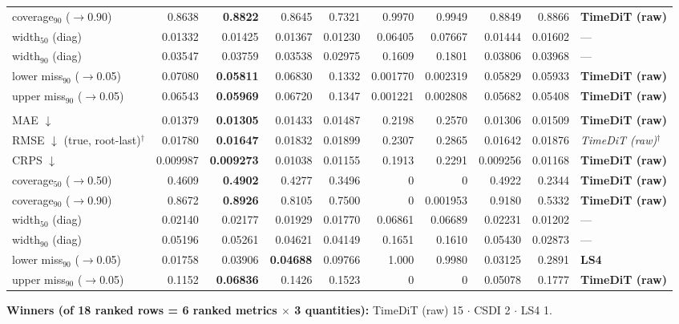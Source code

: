 \documentclass[11pt,a4paper]{article}
\begin{document}
\begin{landscape}
\begin{center}
\begin{tabular}{lrrrrrrrrl}
coverage$_{90}$ ($\to$0.90) & 0.8638 & \textbf{0.8822} & 0.8645 & 0.7321 & 0.9970 & 0.9949 & 0.8849 & 0.8866 & \textbf{TimeDiT (raw)} \\
width$_{50}$ (diag) & 0.01332 & 0.01425 & 0.01367 & 0.01230 & 0.06405 & 0.07667 & 0.01444 & 0.01602 & --- \\
width$_{90}$ (diag) & 0.03547 & 0.03759 & 0.03538 & 0.02975 & 0.1609 & 0.1801 & 0.03806 & 0.03968 & --- \\
lower miss$_{90}$ ($\to$0.05) & 0.07080 & \textbf{0.05811} & 0.06830 & 0.1332 & 0.001770 & 0.002319 & 0.05829 & 0.05933 & \textbf{TimeDiT (raw)} \\
upper miss$_{90}$ ($\to$0.05) & 0.06543 & \textbf{0.05969} & 0.06720 & 0.1347 & 0.001221 & 0.002808 & 0.05682 & 0.05408 & \textbf{TimeDiT (raw)} \\
\addlinespace
\multicolumn{10}{l}{\textbf{rv ($M$ scalar)}} \\
MAE $\downarrow$ & 0.01379 & \textbf{0.01305} & 0.01433 & 0.01487 & 0.2198 & 0.2570 & 0.01306 & 0.01509 & \textbf{TimeDiT (raw)} \\
RMSE $\downarrow$ (true, root-last)$^{\dagger}$ & 0.01780 & \textbf{0.01647} & 0.01832 & 0.01899 & 0.2307 & 0.2865 & 0.01642 & 0.01876 & \textit{TimeDiT (raw)}$^{\dagger}$ \\
CRPS $\downarrow$ & 0.009987 & \textbf{0.009273} & 0.01038 & 0.01155 & 0.1913 & 0.2291 & 0.009256 & 0.01168 & \textbf{TimeDiT (raw)} \\
coverage$_{50}$ ($\to$0.50) & 0.4609 & \textbf{0.4902} & 0.4277 & 0.3496 & 0 & 0 & 0.4922 & 0.2344 & \textbf{TimeDiT (raw)} \\
coverage$_{90}$ ($\to$0.90) & 0.8672 & \textbf{0.8926} & 0.8105 & 0.7500 & 0 & 0.001953 & 0.9180 & 0.5332 & \textbf{TimeDiT (raw)} \\
width$_{50}$ (diag) & 0.02140 & 0.02177 & 0.01929 & 0.01770 & 0.06861 & 0.06689 & 0.02231 & 0.01202 & --- \\
width$_{90}$ (diag) & 0.05196 & 0.05261 & 0.04621 & 0.04149 & 0.1651 & 0.1610 & 0.05430 & 0.02873 & --- \\
lower miss$_{90}$ ($\to$0.05) & 0.01758 & 0.03906 & \textbf{0.04688} & 0.09766 & 1.000 & 0.9980 & 0.03125 & 0.2891 & \textbf{LS4} \\
upper miss$_{90}$ ($\to$0.05) & 0.1152 & \textbf{0.06836} & 0.1426 & 0.1523 & 0 & 0 & 0.05078 & 0.1777 & \textbf{TimeDiT (raw)} \\
\bottomrule
\end{tabular}
\end{center}
\noindent\textbf{Winners (of 18 ranked rows = 6 ranked metrics $\times$ 3 quantities):} TimeDiT (raw) 15 $\cdot$ CSDI 2 $\cdot$ LS4 1.
\end{landscape}
\end{document}
